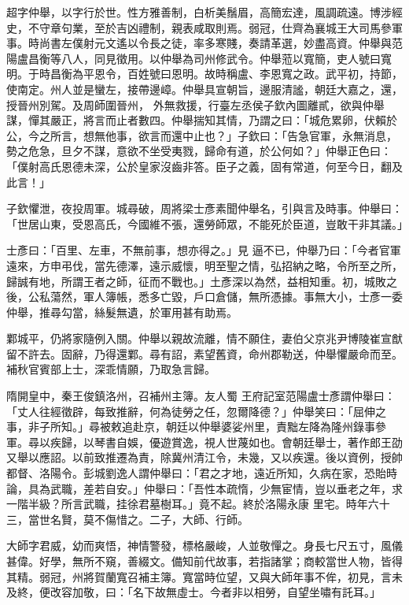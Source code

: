 \begin{pinyinscope}
 超字仲舉，以字行於世。性方雅善制，白析美鬚眉，高簡宏達，風調疏遠。博涉經史，不守章句業，至於吉凶禮制，親表咸取則焉。弱冠，仕齊為襄城王大司馬參軍事。時尚書左僕射元文遙以令長之徒，率多寒賤，奏請革選，妙盡高資。仲舉與范陽盧昌衡等八人，同見徵用。以仲舉為司州修武令。仲舉蒞以寬簡，吏人號曰寬明。于時昌衡為平恩令，百姓號曰恩明。故時稱盧、李恩寬之政。武平初，持節，使南定。州人並是蠻左，接帶邊嶂。仲舉具宣朝旨，邊服清謐，朝廷大嘉之，還，授晉州別駕。及周師圍晉州，
 外無救援，行臺左丞侯子欽內圖離貳，欲與仲舉謀，憚其嚴正，將言而止者數四。仲舉揣知其情，乃謂之曰：「城危累卵，伏賴於公，今之所言，想無他事，欲言而還中止也？」子欽曰：「告急官軍，永無消息，勢之危急，旦夕不謀，意欲不坐受夷戮，歸命有道，於公何如？」仲舉正色曰：「僕射高氏恩德未深，公於皇家沒齒非答。臣子之義，固有常道，何至今日，翻及此言！」



 子欽懼泄，夜投周軍。城尋破，周將梁士彥素聞仲舉名，引與言及時事。仲舉曰：「世居山東，受恩高氏，今國維不張，還勞師眾，不能死於臣道，豈敢干非其議。」



 士彥曰：「百里、左車，不無前事，想亦得之。」見
 逼不已，仲舉乃曰：「今者官軍遠來，方申弔伐，當先德澤，遠示威懷，明至聖之情，弘招納之略，令所至之所，歸誠有地，所謂王者之師，征而不戰也。」土彥深以為然，益相知重。初，城敗之後，公私蕩然，軍人簿帳，悉多亡毀，戶口倉儲，無所憑據。事無大小，士彥一委仲舉，推尋勾當，絲髮無遺，於軍用甚有助焉。



 鄴城平，仍將家隨例入關。仲舉以親故流離，情不願住，妻伯父京兆尹博陵崔宣猷留不許去。固辭，乃得還鄴。尋有詔，素望舊資，命州郡勒送，仲舉懼嚴命而至。補秋官賓部上士，深乖情願，乃取急言歸。



 隋開皇中，秦王俊鎮洛州，召補州主簿。友人蜀
 王府記室范陽盧士彥謂仲舉曰：「丈人往經徵辟，每致推辭，何為徒勞之任，忽爾降德？」仲舉笑曰：「屈伸之事，非子所知。」尋被敕追赴京，朝廷以仲舉婆娑州里，責黜左降為隆州錄事參軍。尋以疾歸，以琴書自娛，優遊賞逸，視人世蔑如也。會朝廷舉士，著作郎王劭又舉以應詔。以前致推遷為責，除冀州清江令，未幾，又以疾還。後以資例，授帥都督、洛陽令。彭城劉逸人謂仲舉曰：「君之才地，遠近所知，久病在家，恐貽時論，具為武職，差若自安。」仲舉曰：「吾性本疏惰，少無宦情，豈以垂老之年，求一階半級？所言武職，挂徐君墓樹耳。」竟不起。終於洛陽永康
 里宅。時年六十三，當世名賢，莫不傷惜之。二子，大師、行師。



 大師字君威，幼而爽悟，神情警發，標格嚴峻，人並敬憚之。身長七尺五寸，風儀甚偉。好學，無所不窺，善綴文。備知前代故事，若指諸掌；商較當世人物，皆得其精。弱冠，州將賀蘭寬召補主簿。寬當時位望，又與大師年事不侔，初見，言未及終，便改容加敬，曰：「名下故無虛士。今者非以相勞，自望坐嘯有託耳。」




\end{pinyinscope}
